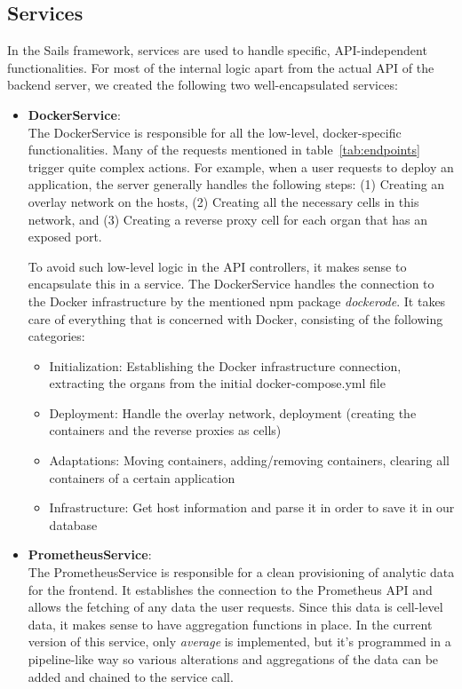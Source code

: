 \documentclass{seal_thesis}
\begin{document}
\subsection{Services}
In the Sails framework, services are used to handle specific, API-independent functionalities.
For most of the internal logic apart from the actual API of the backend server, we created the following two well-encapsulated services:
\begin{itemize}
	\item \textbf{DockerService}: \\
	The DockerService is responsible for all the low-level, docker-specific functionalities.
	Many of the requests mentioned in table~\ref{tab:endpoints} trigger quite complex actions.
	For example, when a user requests to deploy an application, the server generally handles the following steps:
	(1) Creating an overlay network on the hosts,
	(2) Creating all the necessary cells in this network, and
	(3) Creating a reverse proxy cell for each organ that has an exposed port.

	To avoid such low-level logic in the API controllers, it makes sense to encapsulate this in a service.
	The DockerService handles the connection to the Docker infrastructure by the mentioned npm package \textit{dockerode}.
	It takes care of everything that is concerned with Docker, consisting of the following categories:
	\begin{itemize}
		\item Initialization: Establishing the Docker infrastructure connection, extracting the organs from the initial docker-compose.yml file
		\item Deployment: Handle the overlay network, deployment (creating the containers and the reverse proxies as cells)
		\item Adaptations: Moving containers, adding/removing containers, clearing all containers of a certain application
		\item Infrastructure: Get host information and parse it in order to save it in our database
	\end{itemize}
	
	\item \textbf{PrometheusService}: \\
	The PrometheusService is responsible for a clean provisioning of analytic data for the frontend.
	It establishes the connection to the Prometheus API and allows the fetching of any data the user requests.
	Since this data is cell-level data, it makes sense to have aggregation functions in place.
	In the current version of this service, only \textit{average} is implemented, but it's programmed in a pipeline-like way so various alterations and aggregations of the data can be added and chained to the service call.
\end{itemize}
\end{document}
